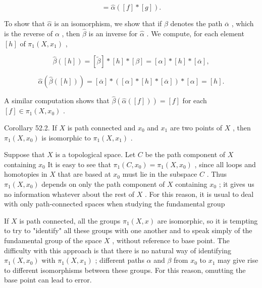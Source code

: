 \documentclass[10pt]{article}
\begin{document}
\[
= \widehat{\alpha }\left( {\left\lbrack  f\right\rbrack   * \left\lbrack  g\right\rbrack  }\right) .
\]

To show that \(\widehat{\alpha }\) is an isomorphism, we show that if \(\beta\) denotes the path \(\overline{\alpha }\) , which is the reverse of \(\alpha\) , then \(\widehat{\beta }\) is an inverse for \(\widehat{\alpha }\) . We compute, for each element \(\left\lbrack  h\right\rbrack\) of \({\pi }_{1}\left( {X,{x}_{1}}\right)\) ,

\[
\widehat{\beta }\left( \left\lbrack  h\right\rbrack  \right)  = \left\lbrack  \widetilde{\beta }\right\rbrack   * \left\lbrack  h\right\rbrack   * \left\lbrack  \beta \right\rbrack   = \left\lbrack  \alpha \right\rbrack   * \left\lbrack  h\right\rbrack   * \left\lbrack  \overline{\alpha }\right\rbrack  ,
\]

\[
\widehat{\alpha }\left( {\widehat{\beta }\left( \left\lbrack  h\right\rbrack  \right) }\right)  = \left\lbrack  \overline{\alpha }\right\rbrack   * \left( {\left\lbrack  \alpha \right\rbrack   * \left\lbrack  h\right\rbrack   * \left\lbrack  \overline{\alpha }\right\rbrack  }\right)  * \left\lbrack  \alpha \right\rbrack   = \left\lbrack  h\right\rbrack  .
\]

A similar computation shows that \(\widehat{\beta }\left( {\widehat{\alpha }\left( \left\lbrack  f\right\rbrack  \right) }\right)  = \left\lbrack  f\right\rbrack\) for each \(\left\lbrack  f\right\rbrack   \in  {\pi }_{1}\left( {X,{x}_{0}}\right)\) .

Corollary 52.2. If \(X\) is path connected and \({x}_{0}\) and \({x}_{1}\) are two points of \(X\) , then \({\pi }_{1}\left( {X,{x}_{0}}\right)\) is isomorphic to \({\pi }_{1}\left( {X,{x}_{1}}\right)\) .

Suppose that \(X\) is a topological space. Let \(C\) be the path component of \(X\) containing \({x}_{0}\) It is easy to see that \({\pi }_{1}\left( {C,{x}_{0}}\right)  = {\pi }_{1}\left( {X,{x}_{0}}\right)\) , since all loops and homotopies in \(X\) that are based at \({x}_{0}\) must lie in the subspace \(C\) . Thus \({\pi }_{1}\left( {X,{x}_{0}}\right)\) depends on only the path component of \(X\) containing \({x}_{0}\) ; it gives us no information whatever about the rest of \(X\) . For this reason, it is usual to deal with only path-connected spaces when studying the fundamental group

If \(X\) is path connected, all the groups \({\pi }_{1}\left( {X,x}\right)\) are isomorphic, so it is tempting to try to "identify" all these groups with one another and to speak simply of the fundamental group of the space \(X\) , without reference to base point. The difficulty with this approach is that there is no natural way of identifying \({\pi }_{1}\left( {X,{x}_{0}}\right)\) with \({\pi }_{1}\left( {X,{x}_{1}}\right)\) ; different paths \(\alpha\) and \(\beta\) from \({x}_{0}\) to \({x}_{1}\) may give rise to different isomorphisms between these groups. For this reason, omutting the base point can lead to error.
\end{document}
